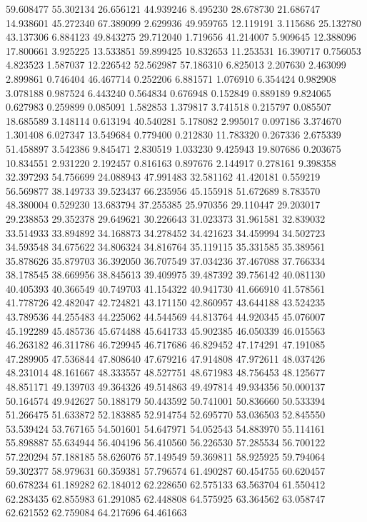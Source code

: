 59.608477
55.302134
26.656121
44.939246
8.495230
28.678730
21.686747
14.938601
45.272340
67.389099
2.629936
49.959765
12.119191
3.115686
25.132780
43.137306
6.884123
49.843275
29.712040
1.719656
41.214007
5.909645
12.388096
17.800661
3.925225
13.533851
59.899425
10.832653
11.253531
16.390717
0.756053
4.823523
1.587037
12.226542
52.562987
57.186310
6.825013
2.207630
2.463099
2.899861
0.746404
46.467714
0.252206
6.881571
1.076910
6.354424
0.982908
3.078188
0.987524
6.443240
0.564834
0.676948
0.152849
0.889189
9.824065
0.627983
0.259899
0.085091
1.582853
1.379817
3.741518
0.215797
0.085507
18.685589
3.148114
0.613194
40.540281
5.178082
2.995017
0.097186
3.374670
1.301408
6.027347
13.549684
0.779400
0.212830
11.783320
0.267336
2.675339
51.458897
3.542386
9.845471
2.830519
1.033230
9.425943
19.807686
0.203675
10.834551
2.931220
2.192457
0.816163
0.897676
2.144917
0.278161
9.398358
32.397293
54.756699
24.088943
47.991483
32.581162
41.420181
0.559219
56.569877
38.149733
39.523437
66.235956
45.155918
51.672689
8.783570
48.380004
0.529230
13.683794
37.255385
25.970356
29.110447
29.203017
29.238853
29.352378
29.649621
30.226643
31.023373
31.961581
32.839032
33.514933
33.894892
34.168873
34.278452
34.421623
34.459994
34.502723
34.593548
34.675622
34.806324
34.816764
35.119115
35.331585
35.389561
35.878626
35.879703
36.392050
36.707549
37.034236
37.467088
37.766334
38.178545
38.669956
38.845613
39.409975
39.487392
39.756142
40.081130
40.405393
40.366549
40.749703
41.154322
40.941730
41.666910
41.578561
41.778726
42.482047
42.724821
43.171150
42.860957
43.644188
43.524235
43.789536
44.255483
44.225062
44.544569
44.813764
44.920345
45.076007
45.192289
45.485736
45.674488
45.641733
45.902385
46.050339
46.015563
46.263182
46.311786
46.729945
46.717686
46.829452
47.174291
47.191085
47.289905
47.536844
47.808640
47.679216
47.914808
47.972611
48.037426
48.231014
48.161667
48.333557
48.527751
48.671983
48.756453
48.125677
48.851171
49.139703
49.364326
49.514863
49.497814
49.934356
50.000137
50.164574
49.942627
50.188179
50.443592
50.741001
50.836660
50.533394
51.266475
51.633872
52.183885
52.914754
52.695770
53.036503
52.845550
53.539424
53.767165
54.501601
54.647971
54.052543
54.883970
55.114161
55.898887
55.634944
56.404196
56.410560
56.226530
57.285534
56.700122
57.220294
57.188185
58.626076
57.149549
59.369811
58.925925
59.794064
59.302377
58.979631
60.359381
57.796574
61.490287
60.454755
60.620457
60.678234
61.189282
62.184012
62.228650
62.575133
63.563704
61.550412
62.283435
62.855983
61.291085
62.448808
64.575925
63.364562
63.058747
62.621552
62.759084
64.217696
64.461663
